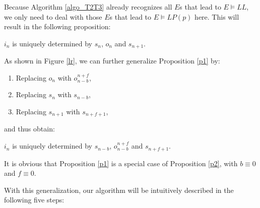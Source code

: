 \documentclass[journal]{IEEEtran}
\begin{document}
Because Algorithm \ref{algo_T2T3} already recognizes all $E$s that lead to $E\vDash LL$,
we only need to deal with those $E$s that lead to $E\vDash LP(p)$ here.
This will result in the following proposition:

\begin{proposition}\label{p1}
$i_n$ is uniquely determined by $s_n$, $o_n$ and $s_{n+1}$.
\end{proposition}

As shown in Figure \ref{lr},
we can further generalize Proposition \ref{p1} by:
\begin{enumerate}
\item Replacing $o_n$ with $o_{n-b}^{n+f}$,
\item Replacing $s_n$ with $s_{n-b}$,
\item Replacing $s_{n+1}$ with $s_{n+f+1}$,
\end{enumerate}
and thus obtain:
\begin{proposition}\label{p2}
$i_n$ is uniquely determined by $s_{n-b}$, $o_{n-b}^{n+f}$ and $s_{n+f+1}$.
\end{proposition}

It is obvious that Proposition \ref{p1} is a special case of Proposition \ref{p2},
with $b\equiv 0$ and $f\equiv 0$.

With this generalization,
our algorithm will be intuitively described in the following five steps:
\end{document}
